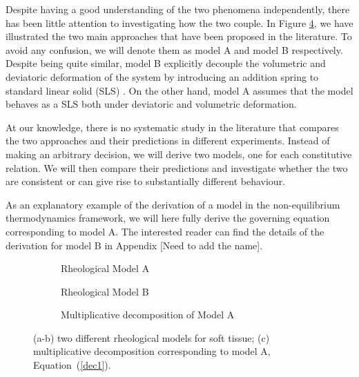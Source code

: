 \documentclass[runningheads]{llncs}
\begin{document}
Despite having a good understanding of the two phenomena independently, there has been little attention to investigating how the two couple. In Figure \ref{figmode}, we have illustrated the two main approaches that have been proposed in the literature. To avoid any confusion, we will denote them as model A and model B respectively. Despite being quite similar, model B explicitly decouple the volumetric and deviatoric deformation of the system by introducing an addition spring to standard linear solid (SLS) \cite{magneto,NGUYEN,Jeru}. On the other hand, model A assumes that the model behaves as a SLS both under deviatoric and volumetric deformation.

At our knowledge, there is no systematic study in the literature that compares the two approaches and their predictions in different experiments. Instead of making an arbitrary decision, we will derive two models, one for each constitutive relation. We will then compare their predictions and investigate whether the two are consistent or can give rise to substantially different behaviour.    

As an explanatory example of the derivation of a model in the non-equilibrium thermodynamics framework, we will here fully derive the governing equation corresponding to model A. The interested reader can find the details of the derivation for model B in Appendix [Need to add the name]. 

\begin{figure}[h!]
	\centering
	\begin{subfigure}{0.32\textwidth}
		\centering
		\Large
	\def\svgwidth{0.95\linewidth}
	
	\caption{Rheological Model A}
	\label{fig1A}
	\end{subfigure}
\hspace{10mm}
	\begin{subfigure}{0.32\textwidth}
	\Large
	\def\svgwidth{0.95\linewidth}
	
	\caption{Rheological Model B}
	\label{fig1B}
\end{subfigure}

\begin{subfigure}{0.34\textwidth}
	\Large
	\def\svgwidth{1.75\linewidth}
	
	\caption{Multiplicative decomposition of Model A}
	\label{Model2}
\end{subfigure}
\vspace{5mm}
\caption{(a-b) two different rheological models for soft tissue; (c) multiplicative decomposition corresponding to model A, Equation~(\ref{dec1}).}
\label{figmode}
\end{figure}
\end{document}

